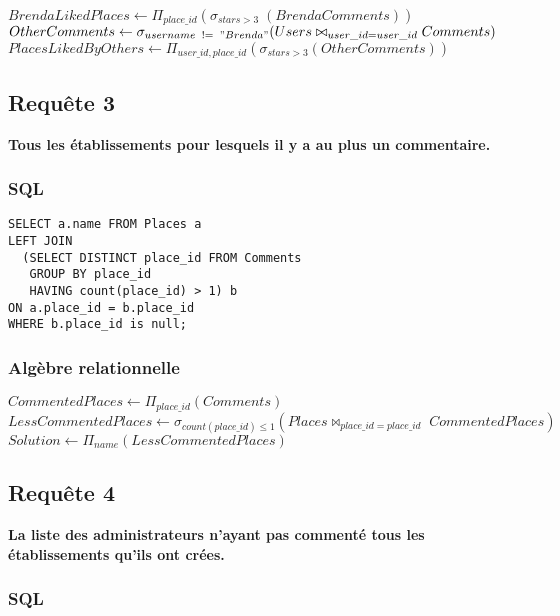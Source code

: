 \documentclass[a4paper,10pt]{article}
\begin{document}
$BrendaLikedPlaces \leftarrow \Pi_{place\_id} (\sigma_{stars>3}\;(BrendaComments))$ \\

$OtherComments \leftarrow \sigma_{username\;\; != \;\;"Brenda"} (Users \bowtie_{user\_id=user\_id} Comments )$\\

$PlacesLikedByOthers \leftarrow \Pi_{user\_id, place\_id} ( \sigma_{stars>3} (OtherComments)) $

\newpage

\subsection{Requête 3}

\textbf{Tous les établissements pour lesquels il y a au plus un commentaire.}

\subsubsection{SQL}

\begin{verbatim}
SELECT a.name FROM Places a 
LEFT JOIN
  (SELECT DISTINCT place_id FROM Comments 
   GROUP BY place_id 
   HAVING count(place_id) > 1) b 
ON a.place_id = b.place_id 
WHERE b.place_id is null;
\end{verbatim}

\subsubsection{Algèbre relationnelle}

$ CommentedPlaces \leftarrow \Pi_{place\_id} (Comments) $ \\

$ LessCommentedPlaces \leftarrow \sigma_{count(place\_id) \leq 1} (Places \bowtie_{place\_id = place\_id} \; CommentedPlaces)$ \\

$ Solution \leftarrow \Pi_{name}(LessCommentedPlaces) $

\newpage

\subsection{Requête 4}

\textbf{La liste des administrateurs n’ayant pas commenté tous les établissements qu’ils ont crées.}

\subsubsection{SQL}
\end{document}

